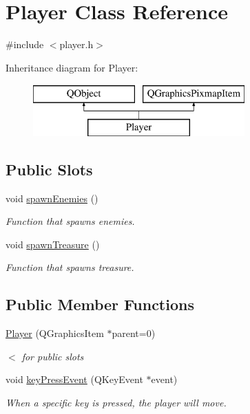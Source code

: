 \hypertarget{class_player}{}\section{Player Class Reference}
\label{class_player}


{\ttfamily \#include $<$player.\+h$>$}

Inheritance diagram for Player\+:\begin{figure}[H]
\begin{center}
\leavevmode
\includegraphics[height=2.000000cm]{class_player}
\end{center}
\end{figure}
\subsection*{Public Slots}
\begin{DoxyCompactItemize}
\item 
void \hyperlink{class_player_aeed92c166b9d0e272586baf3d23abe73}{spawn\+Enemies} ()
\begin{DoxyCompactList}\small\item\em Function that spawns enemies. \end{DoxyCompactList}\item 
void \hyperlink{class_player_a3380dce486a55b2dc5022416780495bb}{spawn\+Treasure} ()
\begin{DoxyCompactList}\small\item\em Function that spawns treasure. \end{DoxyCompactList}\end{DoxyCompactItemize}
\subsection*{Public Member Functions}
\begin{DoxyCompactItemize}
\item 
\hyperlink{class_player_a4d193d415c83e385e41f5daf4cc5b06c}{Player} (Q\+Graphics\+Item $\ast$parent=0)
\begin{DoxyCompactList}\small\item\em $<$ for public slots \end{DoxyCompactList}\item 
void \hyperlink{class_player_a4d269c4118c29b0ee85c1e0f674260ee}{key\+Press\+Event} (Q\+Key\+Event $\ast$event)
\begin{DoxyCompactList}\small\item\em When a specific key is pressed, the player will move. \end{DoxyCompactList}\end{DoxyCompactItemize}



